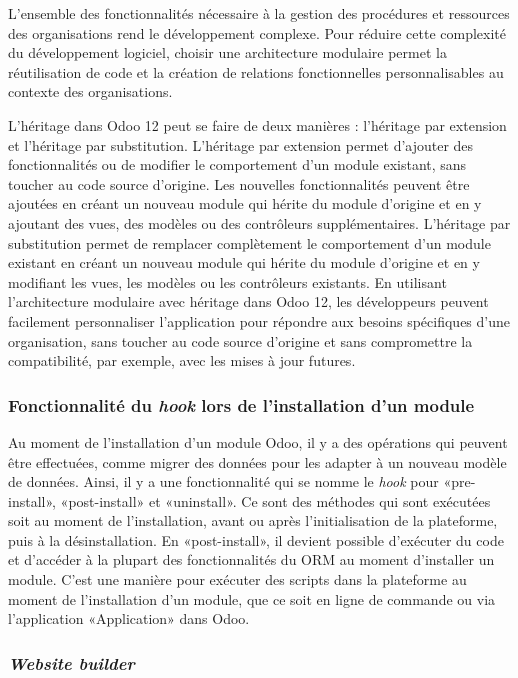 L'ensemble des fonctionnalités nécessaire à la gestion des procédures et ressources des organisations rend le développement complexe. Pour réduire cette complexité du développement logiciel, choisir une architecture modulaire permet la réutilisation de code et la création de relations fonctionnelles personnalisables au contexte des organisations.

L’héritage dans Odoo 12 peut se faire de deux manières : l'héritage par extension et l'héritage par substitution. L’héritage par extension permet d’ajouter des fonctionnalités ou de modifier le comportement d’un module existant, sans toucher au code source d’origine. Les nouvelles fonctionnalités peuvent être ajoutées en créant un nouveau module qui hérite du module d’origine et en y ajoutant des vues, des modèles ou des contrôleurs supplémentaires. L’héritage par substitution permet de remplacer complètement le comportement d’un module existant en créant un nouveau module qui hérite du module d’origine et en y modifiant les vues, les modèles ou les contrôleurs existants. En utilisant l’architecture modulaire avec héritage dans Odoo 12, les développeurs peuvent facilement personnaliser l’application pour répondre aux besoins spécifiques d'une organisation, sans toucher au code source d’origine et sans compromettre la compatibilité, par exemple, avec les mises à jour futures.

\subsubsection{Fonctionnalité du \textit{hook} lors de l’installation d’un module}

Au moment de l’installation d’un module Odoo, il y a des opérations qui peuvent être effectuées, comme migrer des données pour les adapter à un nouveau modèle de données. Ainsi, il y a une fonctionnalité qui se nomme le \textit{hook} pour «pre-install», «post-install» et «uninstall». Ce sont des méthodes qui sont exécutées soit au moment de l’installation, avant ou après l’initialisation de la plateforme, puis à la désinstallation. En «post-install», il devient possible d’exécuter du code et d'accéder à la plupart des fonctionnalités du ORM au moment d’installer un module. C’est une manière pour exécuter des scripts dans la plateforme au moment de l’installation d’un module, que ce soit en ligne de commande ou via l’application «Application» dans Odoo.

\subsubsection{\textit{Website builder}}

